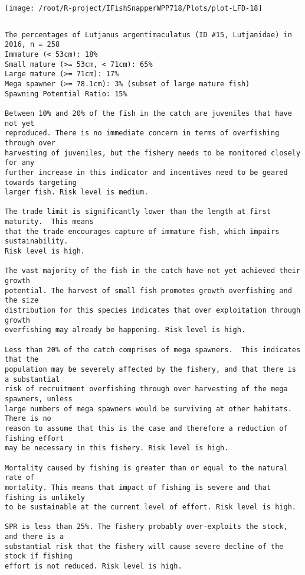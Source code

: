 \documentclass{report}\usepackage[]{graphicx}\usepackage[]{color}
\makeatletter
\def\maxwidth{ %
  \ifdim\Gin@nat@width>\linewidth
    \linewidth
  \else
    \Gin@nat@width
  \fi
}
\newenvironment{kframe}{%
 \def\at@end@of@kframe{}%
 \ifinner\ifhmode%
  \def\at@end@of@kframe{\end{minipage}}%
  \begin{minipage}{\columnwidth}%
 \fi\fi%
 \def\FrameCommand##1{\hskip\@totalleftmargin \hskip-\fboxsep
 \colorbox{shadecolor}{##1}\hskip-\fboxsep
     \hskip-\linewidth \hskip-\@totalleftmargin \hskip\columnwidth}%
 \MakeFramed {\advance\hsize-\width
   \@totalleftmargin\z@ \linewidth\hsize
   \@setminipage}}%
 {\par\unskip\endMakeFramed%
 \at@end@of@kframe}
\newenvironment{knitrout}{}{} %
\makeatother
\begin{document}
\begin{knitrout}
\texttt{[image: /root/R-project/IFishSnapperWPP718/Plots/plot-LFD-18]} 
\begin{kframe}\begin{verbatim}
\end{verbatim}
\end{kframe}
\clearpage
\newpage
\begin{kframe}\begin{verbatim}The percentages of Lutjanus argentimaculatus (ID #15, Lutjanidae) in 2016, n = 258
Immature (< 53cm): 18%
Small mature (>= 53cm, < 71cm): 65%
Large mature (>= 71cm): 17%
Mega spawner (>= 78.1cm): 3% (subset of large mature fish)
Spawning Potential Ratio: 15%
 
Between 10% and 20% of the fish in the catch are juveniles that have not yet
reproduced. There is no immediate concern in terms of overfishing through over
harvesting of juveniles, but the fishery needs to be monitored closely for any
further increase in this indicator and incentives need to be geared towards targeting
larger fish. Risk level is medium.

The trade limit is significantly lower than the length at first maturity.  This means
that the trade encourages capture of immature fish, which impairs sustainability.
Risk level is high.

The vast majority of the fish in the catch have not yet achieved their growth
potential. The harvest of small fish promotes growth overfishing and the size
distribution for this species indicates that over exploitation through growth
overfishing may already be happening. Risk level is high.

Less than 20% of the catch comprises of mega spawners.  This indicates that the
population may be severely affected by the fishery, and that there is a substantial
risk of recruitment overfishing through over harvesting of the mega spawners, unless
large numbers of mega spawners would be surviving at other habitats. There is no
reason to assume that this is the case and therefore a reduction of fishing effort
may be necessary in this fishery. Risk level is high.
 
Mortality caused by fishing is greater than or equal to the natural rate of
mortality. This means that impact of fishing is severe and that fishing is unlikely
to be sustainable at the current level of effort. Risk level is high.
 
SPR is less than 25%. The fishery probably over-exploits the stock, and there is a
substantial risk that the fishery will cause severe decline of the stock if fishing
effort is not reduced. Risk level is high.
 

\end{verbatim}
\end{kframe}
\end{knitrout}
\end{document}
